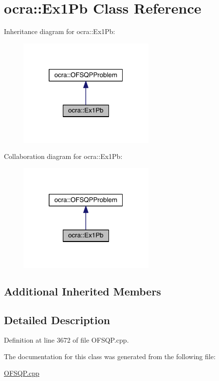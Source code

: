 \hypertarget{classocra_1_1Ex1Pb}{}\section{ocra\+:\+:Ex1\+Pb Class Reference}
\label{classocra_1_1Ex1Pb}


Inheritance diagram for ocra\+:\+:Ex1\+Pb\+:\nopagebreak
\begin{figure}[H]
\begin{center}
\leavevmode
\includegraphics[width=193pt]{d4/d61/classocra_1_1Ex1Pb__inherit__graph}
\end{center}
\end{figure}


Collaboration diagram for ocra\+:\+:Ex1\+Pb\+:\nopagebreak
\begin{figure}[H]
\begin{center}
\leavevmode
\includegraphics[width=193pt]{de/d6c/classocra_1_1Ex1Pb__coll__graph}
\end{center}
\end{figure}
\subsection*{Additional Inherited Members}


\subsection{Detailed Description}


Definition at line 3672 of file O\+F\+S\+Q\+P.\+cpp.



The documentation for this class was generated from the following file\+:\begin{DoxyCompactItemize}
\item 
\hyperlink{OFSQP_8cpp}{O\+F\+S\+Q\+P.\+cpp}\end{DoxyCompactItemize}
